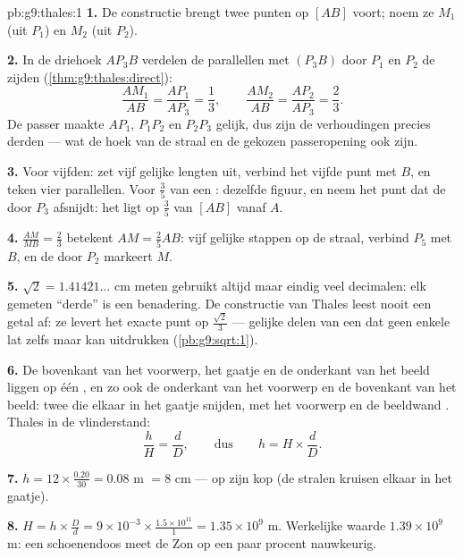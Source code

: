 \begin{solution}{pb:g9:thales:1}
\textbf{1.} De constructie brengt twee punten op $[AB]$ voort; noem ze $M_1$ (uit
$P_1$) en $M_2$ (uit $P_2$).

\textbf{2.} In de driehoek $A P_3 B$ verdelen de parallellen met $(P_3 B)$ door
$P_1$ en $P_2$ de zijden  (\cref{thm:g9:thales:direct}):
\[
\frac{A M_1}{AB} = \frac{A P_1}{A P_3} = \frac13,
\qquad
\frac{A M_2}{AB} = \frac{A P_2}{A P_3} = \frac23 .
\]
De passer maakte $A P_1$, $P_1 P_2$ en $P_2 P_3$ gelijk, dus zijn de verhoudingen
precies derden --- wat de hoek van de straal en de gekozen passeropening ook zijn.

\textbf{3.} Voor vijfden: zet vijf gelijke lengten uit, verbind het vijfde punt met
$B$, en teken vier parallellen. Voor $\frac35$ van een : dezelfde figuur, en
neem het punt dat de  door $P_3$ afsnijdt: het ligt op $\frac{3}{5}$ van
$[AB]$ vanaf $A$.

\textbf{4.} $\frac{AM}{MB} = \frac23$ betekent $AM = \frac25 AB$: vijf gelijke
stappen op de straal, verbind $P_5$ met $B$, en de  door $P_2$ markeert
$M$.

\textbf{5.} $\sqrt2 = 1.41421\ldots$ cm meten gebruikt altijd maar eindig veel
decimalen: elk gemeten ``derde'' is een benadering. De constructie van Thales leest
nooit een getal af: ze levert het exacte punt op $\frac{\sqrt2}{3}$ --- gelijke
delen van een  dat geen enkele lat zelfs maar kan uitdrukken
(\cref{pb:g9:sqrt:1}).

\textbf{6.} De bovenkant van het voorwerp, het gaatje en de onderkant van het beeld
liggen op één , en zo ook de onderkant van het voorwerp en de bovenkant van het
beeld: twee  die elkaar in het gaatje snijden, met het voorwerp en de
beeldwand . Thales in de vlinderstand:
\[
\frac{h}{H} = \frac{d}{D},
\qquad\text{dus}\qquad
h = H \times \frac dD .
\]

\textbf{7.} $h = 12 \times \frac{0.20}{30} = 0.08$ m $= 8$ cm --- op zijn kop (de
stralen kruisen elkaar in het gaatje).

\textbf{8.} $H = h \times \frac Dd = 9 \times 10^{-3} \times
\frac{1.5 \times 10^{11}}{1} = 1.35 \times 10^{9}$ m. Werkelijke waarde
$1.39 \times 10^9$ m: een schoenendoos meet de Zon op een paar procent
nauwkeurig.


\end{solution}
